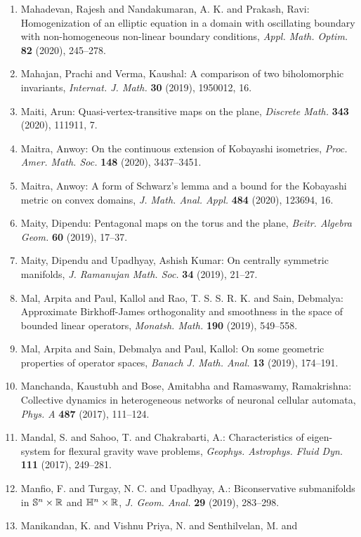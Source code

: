 \begin{enumerate}
\item Mahadevan, Rajesh and Nandakumaran, A. K. and Prakash, Ravi: Homogenization of an elliptic equation in a domain with
oscillating boundary with non-homogeneous non-linear boundary
conditions, \emph{Appl. Math. Optim.} {\bf 82} (2020), 245--278.
\item Mahajan, Prachi and Verma, Kaushal: A comparison of two biholomorphic invariants, \emph{Internat. J. Math.} {\bf 30} (2019), 1950012, 16.
\item Maiti, Arun: Quasi-vertex-transitive maps on the plane, \emph{Discrete Math.} {\bf 343} (2020), 111911, 7.
\item Maitra, Anwoy: On the continuous extension of {K}obayashi isometries, \emph{Proc. Amer. Math. Soc.} {\bf 148} (2020), 3437--3451.
\item Maitra, Anwoy: A form of {S}chwarz's lemma and a bound for the {K}obayashi
metric on convex domains, \emph{J. Math. Anal. Appl.} {\bf 484} (2020), 123694, 16.
\item Maity, Dipendu: Pentagonal maps on the torus and the plane, \emph{Beitr. Algebra Geom.} {\bf 60} (2019), 17--37.
\item Maity, Dipendu and Upadhyay, Ashish Kumar: On centrally symmetric manifolds, \emph{J. Ramanujan Math. Soc.} {\bf 34} (2019), 21--27.
\item Mal, Arpita and Paul, Kallol and Rao, T. S. S. R. K. and Sain,
Debmalya: Approximate {B}irkhoff-{J}ames orthogonality and smoothness in
the space of bounded linear operators, \emph{Monatsh. Math.} {\bf 190} (2019), 549--558.
\item Mal, Arpita and Sain, Debmalya and Paul, Kallol: On some geometric properties of operator spaces, \emph{Banach J. Math. Anal.} {\bf 13} (2019), 174--191.
\item Manchanda, Kaustubh and Bose, Amitabha and Ramaswamy,
Ramakrishna: Collective dynamics in heterogeneous networks of neuronal
cellular automata, \emph{Phys. A} {\bf 487} (2017), 111--124.
\item Mandal, S. and Sahoo, T. and Chakrabarti, A.: Characteristics of eigen-system for flexural gravity wave
problems, \emph{Geophys. Astrophys. Fluid Dyn.} {\bf 111} (2017), 249--281.
\item Manfio, F. and Turgay, N. C. and Upadhyay, A.: Biconservative submanifolds in {$\Bbb{S}^n\times\Bbb{R}$} and
{$\Bbb{H}^n\times\Bbb{R}$}, \emph{J. Geom. Anal.} {\bf 29} (2019), 283--298.
\item Manikandan, K. and Vishnu Priya, N. and Senthilvelan, M. and

\end{enumerate}
